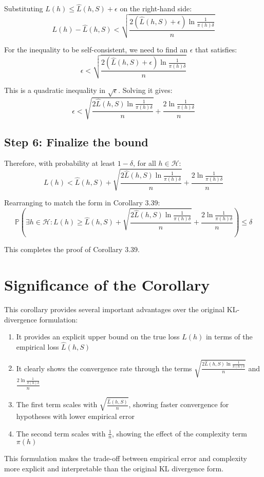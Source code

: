 \documentclass{article}
\begin{document}
Substituting $L(h) \leq \hat{L}(h,S) + \epsilon$ on the right-hand side:
\begin{equation}
L(h) - \hat{L}(h,S) < \sqrt{\frac{2(\hat{L}(h,S) + \epsilon)\ln \frac{1}{\pi(h)\delta}}{n}}
\end{equation}

For the inequality to be self-consistent, we need to find an $\epsilon$ that satisfies:
\begin{equation}
\epsilon < \sqrt{\frac{2(\hat{L}(h,S) + \epsilon)\ln \frac{1}{\pi(h)\delta}}{n}}
\end{equation}

This is a quadratic inequality in $\sqrt{\epsilon}$. Solving it gives:
\begin{equation}
\epsilon < \sqrt{\frac{2\hat{L}(h,S)\ln \frac{1}{\pi(h)\delta}}{n}} + \frac{2\ln \frac{1}{\pi(h)\delta}}{n}
\end{equation}

\subsection{Step 6: Finalize the bound}

Therefore, with probability at least $1-\delta$, for all $h \in \mathcal{H}$:
\begin{equation}
L(h) < \hat{L}(h,S) + \sqrt{\frac{2\hat{L}(h,S)\ln \frac{1}{\pi(h)\delta}}{n}} + \frac{2\ln \frac{1}{\pi(h)\delta}}{n}
\end{equation}

Rearranging to match the form in Corollary 3.39:
\begin{equation}
\mathbb{P}\left(\exists h \in \mathcal{H} : L(h) \geq \hat{L}(h, S) + \sqrt{\frac{2\hat{L}(h,S)\ln \frac{1}{\pi(h)\delta}}{n}} + \frac{2\ln \frac{1}{\pi(h)\delta}}{n}\right) \leq \delta
\end{equation}

This completes the proof of Corollary 3.39.

\section{Significance of the Corollary}

This corollary provides several important advantages over the original KL-divergence formulation:

\begin{enumerate}
\item It provides an explicit upper bound on the true loss $L(h)$ in terms of the empirical loss $\hat{L}(h,S)$
\item It clearly shows the convergence rate through the terms $\sqrt{\frac{2\hat{L}(h,S)\ln \frac{1}{\pi(h)\delta}}{n}}$ and $\frac{2\ln \frac{1}{\pi(h)\delta}}{n}$
\item The first term scales with $\sqrt{\frac{\hat{L}(h,S)}{n}}$, showing faster convergence for hypotheses with lower empirical error
\item The second term scales with $\frac{1}{n}$, showing the effect of the complexity term $\pi(h)$
\end{enumerate}

This formulation makes the trade-off between empirical error and complexity more explicit and interpretable than the original KL divergence form.
\end{document}
